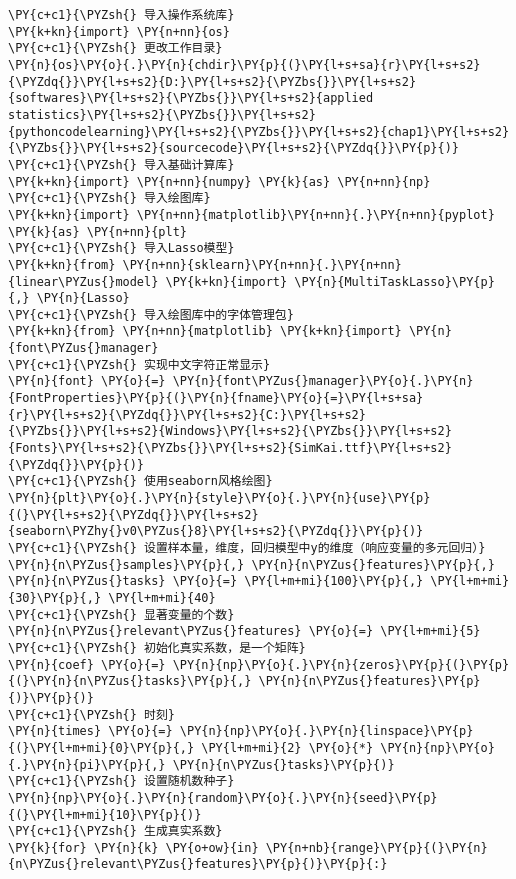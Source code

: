 \begin{Verbatim}[commandchars=\\\{\}]
\PY{c+c1}{\PYZsh{} 导入操作系统库}
\PY{k+kn}{import} \PY{n+nn}{os}
\PY{c+c1}{\PYZsh{} 更改工作目录}
\PY{n}{os}\PY{o}{.}\PY{n}{chdir}\PY{p}{(}\PY{l+s+sa}{r}\PY{l+s+s2}{\PYZdq{}}\PY{l+s+s2}{D:}\PY{l+s+s2}{\PYZbs{}}\PY{l+s+s2}{softwares}\PY{l+s+s2}{\PYZbs{}}\PY{l+s+s2}{applied statistics}\PY{l+s+s2}{\PYZbs{}}\PY{l+s+s2}{pythoncodelearning}\PY{l+s+s2}{\PYZbs{}}\PY{l+s+s2}{chap1}\PY{l+s+s2}{\PYZbs{}}\PY{l+s+s2}{sourcecode}\PY{l+s+s2}{\PYZdq{}}\PY{p}{)}
\PY{c+c1}{\PYZsh{} 导入基础计算库}
\PY{k+kn}{import} \PY{n+nn}{numpy} \PY{k}{as} \PY{n+nn}{np}
\PY{c+c1}{\PYZsh{} 导入绘图库}
\PY{k+kn}{import} \PY{n+nn}{matplotlib}\PY{n+nn}{.}\PY{n+nn}{pyplot} \PY{k}{as} \PY{n+nn}{plt}
\PY{c+c1}{\PYZsh{} 导入Lasso模型}
\PY{k+kn}{from} \PY{n+nn}{sklearn}\PY{n+nn}{.}\PY{n+nn}{linear\PYZus{}model} \PY{k+kn}{import} \PY{n}{MultiTaskLasso}\PY{p}{,} \PY{n}{Lasso}
\PY{c+c1}{\PYZsh{} 导入绘图库中的字体管理包}
\PY{k+kn}{from} \PY{n+nn}{matplotlib} \PY{k+kn}{import} \PY{n}{font\PYZus{}manager}
\PY{c+c1}{\PYZsh{} 实现中文字符正常显示}
\PY{n}{font} \PY{o}{=} \PY{n}{font\PYZus{}manager}\PY{o}{.}\PY{n}{FontProperties}\PY{p}{(}\PY{n}{fname}\PY{o}{=}\PY{l+s+sa}{r}\PY{l+s+s2}{\PYZdq{}}\PY{l+s+s2}{C:}\PY{l+s+s2}{\PYZbs{}}\PY{l+s+s2}{Windows}\PY{l+s+s2}{\PYZbs{}}\PY{l+s+s2}{Fonts}\PY{l+s+s2}{\PYZbs{}}\PY{l+s+s2}{SimKai.ttf}\PY{l+s+s2}{\PYZdq{}}\PY{p}{)}
\PY{c+c1}{\PYZsh{} 使用seaborn风格绘图}
\PY{n}{plt}\PY{o}{.}\PY{n}{style}\PY{o}{.}\PY{n}{use}\PY{p}{(}\PY{l+s+s2}{\PYZdq{}}\PY{l+s+s2}{seaborn\PYZhy{}v0\PYZus{}8}\PY{l+s+s2}{\PYZdq{}}\PY{p}{)}
\PY{c+c1}{\PYZsh{} 设置样本量，维度，回归模型中y的维度（响应变量的多元回归）}
\PY{n}{n\PYZus{}samples}\PY{p}{,} \PY{n}{n\PYZus{}features}\PY{p}{,} \PY{n}{n\PYZus{}tasks} \PY{o}{=} \PY{l+m+mi}{100}\PY{p}{,} \PY{l+m+mi}{30}\PY{p}{,} \PY{l+m+mi}{40}
\PY{c+c1}{\PYZsh{} 显著变量的个数}
\PY{n}{n\PYZus{}relevant\PYZus{}features} \PY{o}{=} \PY{l+m+mi}{5}
\PY{c+c1}{\PYZsh{} 初始化真实系数，是一个矩阵}
\PY{n}{coef} \PY{o}{=} \PY{n}{np}\PY{o}{.}\PY{n}{zeros}\PY{p}{(}\PY{p}{(}\PY{n}{n\PYZus{}tasks}\PY{p}{,} \PY{n}{n\PYZus{}features}\PY{p}{)}\PY{p}{)}
\PY{c+c1}{\PYZsh{} 时刻}
\PY{n}{times} \PY{o}{=} \PY{n}{np}\PY{o}{.}\PY{n}{linspace}\PY{p}{(}\PY{l+m+mi}{0}\PY{p}{,} \PY{l+m+mi}{2} \PY{o}{*} \PY{n}{np}\PY{o}{.}\PY{n}{pi}\PY{p}{,} \PY{n}{n\PYZus{}tasks}\PY{p}{)}
\PY{c+c1}{\PYZsh{} 设置随机数种子}
\PY{n}{np}\PY{o}{.}\PY{n}{random}\PY{o}{.}\PY{n}{seed}\PY{p}{(}\PY{l+m+mi}{10}\PY{p}{)}
\PY{c+c1}{\PYZsh{} 生成真实系数}
\PY{k}{for} \PY{n}{k} \PY{o+ow}{in} \PY{n+nb}{range}\PY{p}{(}\PY{n}{n\PYZus{}relevant\PYZus{}features}\PY{p}{)}\PY{p}{:}

\end{Verbatim}
